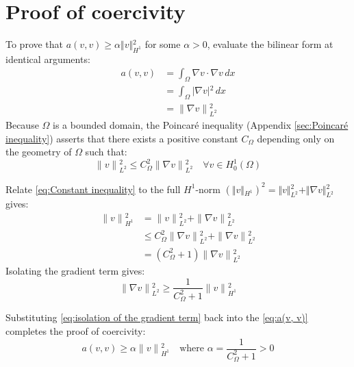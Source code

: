 \documentclass[conference]{IEEEtran}
\begin{document}
\newpage
\appendices
\section{Proof of coercivity} \label{sec:proof of coercivity}

To prove that $a(v,v) \ge \alpha \Vert{}v\Vert{}_{H^1}^2$ for some $\alpha > 0$, evaluate the bilinear form at identical arguments:
\begin{equation}
\begin{aligned}
    a(v,v) &= \int_{\Omega }\nabla v\cdot \nabla v \,dx \\
    &= \int_{\Omega }|\nabla v|{}^{2}\,dx \\
    &= \|\nabla v\|{}_{L^{2}}^{2}
    \label{eq:a(v, v)}
\end{aligned}
\end{equation}
Because $\Omega$ is a bounded domain, the Poincaré inequality (Appendix \ref{sec:Poincaré inequality}) asserts that there exists a positive constant $C_{\Omega }$ depending only on the geometry of $\Omega$ such that:
\begin{equation}
    \|v\|{}_{L^{2}}^{2} \le C_{\Omega }^{2}\|\nabla v\|{}_{L^{2}}^{2}\quad \forall v\in H_{0}^{1}(\Omega )
    \label{eq:Constant inequality}
\end{equation}

Relate \ref{eq:Constant inequality} to the full $H^{1}$-norm $(\Vert{}v\Vert{}_{H^1})^2 = \Vert{}v\Vert{}_{L^2}^2 + \Vert{}\nabla v\Vert{}_{L^2}^2$ gives:
\begin{equation}
\begin{aligned}
    \|v\|{}_{H^{1}}^{2} &= \|v\|{}_{L^{2}}^{2}+\|\nabla v\|{}_{L^{2}}^{2} \\
    &\le C_{\Omega }^{2}\|\nabla v\|{}_{L^{2}}^{2}+\|\nabla v\|{}_{L^{2}}^{2} \\
    &= (C_{\Omega }^{2}+1)\|\nabla v\|{}_{L^{2}}^{2}
\end{aligned}
\end{equation}
Isolating the gradient term gives:
\begin{equation}
    \|\nabla v\|{}_{L^{2}}^{2}\ge \frac{1}{C_{\Omega }^{2}+1}\|v\|{}_{H^{1}}^{2}
    \label{eq:isolation of the gradient term}
\end{equation}

Substituting \ref{eq:isolation of the gradient term} back into the \ref{eq:a(v, v)} completes the proof of coercivity:
\begin{equation}
    a(v,v)\ge \alpha \|v\|{}_{H^{1}}^{2}\quad \text{where\ }\alpha =\frac{1}{C_{\Omega }^{2}+1}>0
\end{equation}
\end{document}
